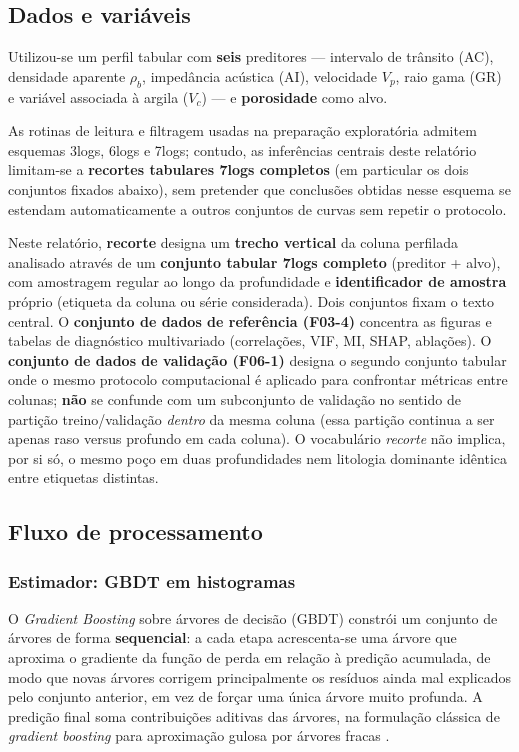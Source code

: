 \documentclass[12pt,a4paper]{article}
\newcommand{\dadosref}{conjunto de dados de referência (F03-4)}
\newcommand{\dadosval}{conjunto de dados de validação (F06-1)}
\begin{document}
\subsection{Dados e variáveis}
Utilizou-se um perfil tabular com \textbf{seis} preditores --- intervalo de trânsito (AC),
densidade aparente \(\rho_b\), impedância acústica (AI), velocidade \(V_p\),
raio gama (GR) e variável associada à argila (\(V_c\)) --- e \textbf{porosidade} como alvo.

As rotinas de leitura e filtragem usadas na preparação exploratória admitem esquemas
3logs, 6logs e 7logs; contudo, as inferências centrais deste relatório limitam-se a
\textbf{recortes tabulares 7logs completos} (em particular os dois conjuntos fixados
abaixo), sem pretender que conclusões obtidas nesse esquema se estendam automaticamente
a outros conjuntos de curvas sem repetir o protocolo.

Neste relatório, \textbf{recorte} designa um \textbf{trecho vertical} da coluna
perfilada analisado através de um \textbf{conjunto tabular 7logs completo}
(preditor + alvo), com amostragem regular ao longo da profundidade e
\textbf{identificador de amostra} próprio (etiqueta da coluna ou série considerada).
Dois conjuntos fixam o texto central. O \textbf{\dadosref} concentra as figuras e
tabelas de diagnóstico multivariado (correlações, VIF, MI, SHAP, ablações). O
\textbf{\dadosval} designa o segundo conjunto tabular onde o mesmo protocolo
computacional é aplicado para confrontar métricas entre
colunas; \textbf{não} se confunde com um subconjunto de validação no sentido de
partição treino/validação \emph{dentro} da mesma coluna (essa partição continua a ser
apenas raso versus profundo em cada coluna). O vocabulário \textit{recorte} não implica,
por si só, o mesmo poço em duas profundidades nem litologia dominante idêntica entre
etiquetas distintas.

\subsection{Fluxo de processamento}

\subsubsection{Estimador: GBDT em histogramas}\label{subsec:gbdt_just}
O \textit{Gradient Boosting} sobre árvores de decisão (GBDT) constrói um conjunto de
árvores de forma \textbf{sequencial}: a cada etapa acrescenta-se uma árvore que
aproxima o gradiente da função de perda em relação à predição acumulada, de modo
que novas árvores corrigem principalmente os resíduos ainda mal explicados pelo
conjunto anterior, em vez de forçar uma única árvore muito profunda. A predição
final soma contribuições aditivas das árvores, na formulação clássica de
\textit{gradient boosting} para aproximação gulosa por árvores fracas
\citep{friedman2001greedy}.
\end{document}
